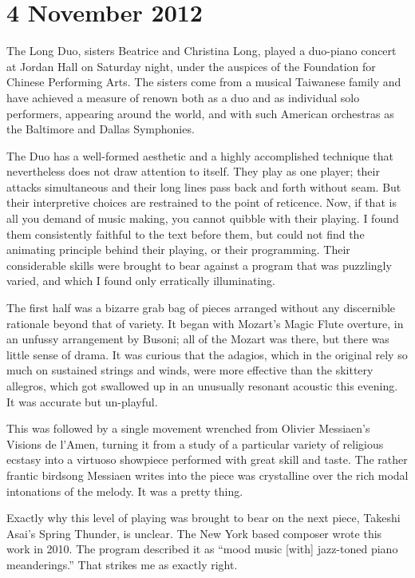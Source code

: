 
\chapter{4 November 2012}

The Long Duo, sisters Beatrice and Christina Long, played a duo-piano concert at Jordan Hall on Saturday night, under the auspices of the Foundation for Chinese Performing Arts. The sisters come from a musical Taiwanese family and have achieved a measure of renown both as a duo and as individual solo performers, appearing around the world, and with such American orchestras as the Baltimore and Dallas Symphonies.

The Duo has a well-formed aesthetic and a highly accomplished technique that nevertheless does not draw attention to itself. They play as one player; their attacks simultaneous and their long lines pass back and forth without seam. But their interpretive choices are restrained to the point of reticence. Now, if that is all you demand of music making, you cannot quibble with their playing. I found them consistently faithful to the text before them, but could not find the animating principle behind their playing, or their programming. Their considerable skills were brought to bear against a program that was puzzlingly varied, and which I found only erratically illuminating.

The first half was a bizarre grab bag of pieces arranged without any discernible rationale beyond that of variety. It began with Mozart's Magic Flute overture, in an unfussy arrangement by Busoni; all of the Mozart was there, but there was little sense of drama. It was curious that the adagios, which in the original rely so much on sustained strings and winds, were more effective than the skittery allegros, which got swallowed up in an unusually resonant acoustic this evening. It was accurate but un-playful.

This was followed by a single movement wrenched from Olivier Messiaen's Visions de l'Amen, turning it from a study of a particular variety of religious ecstasy into a virtuoso showpiece performed with great skill and taste. The rather frantic birdsong Messiaen writes into the piece was crystalline over the rich modal intonations of the melody. It was a pretty thing.

Exactly why this level of playing was brought to bear on the next piece, Takeshi Asai's Spring Thunder, is unclear. The New York based composer wrote this work in 2010. The program described it as “mood music [with] jazz-toned piano meanderings.” That strikes me as exactly right.

